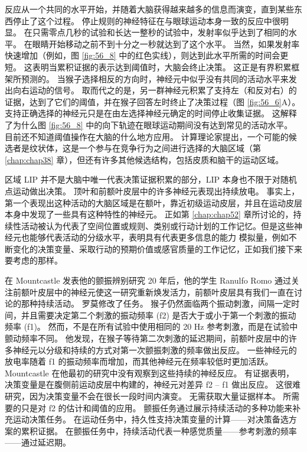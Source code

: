 反应从一个共同的水平开始，并随着大脑获得越来越多的信息而演变，直到某些东西停止了这个过程。 停止规则的神经特征在与眼球运动本身一致的反应中很明显。 在只需零点几秒的试验和长达一整秒的试验中，发射率似乎达到了相同的水平。 在眼睛开始移动之前不到十分之一秒就达到了这个水平。 当然，如果发射率快速增加（例如，图 \ref{fig:56_8} 中的红色实线），则达到此水平所需的时间会更短。 这表明当累积证据的表示达到阈值时，大脑会终止决策。 这正是有界积累框架所预测的。 当猴子选择相反的方向时，神经元中似乎没有共同的活动水平来发出向右运动的信号。 取而代之的是，另一群神经元积累了支持左（和反对右）的证据，达到了它们的阈值，并在猴子回答左时终止了决策过程（图 \ref{fig:56_6}A）。 支持正确选择的神经元只是在由左选择神经元确定的时间停止收集证据。 这解释了为什么图 \ref{fig:56_8} 中的向下轨迹在眼球运动期间没有达到常见的活动水平。 目前还不知道阈值操作在大脑的什么地方应用。 计算理论家提出，一个可能的候选者是纹状体，这是一个参与在竞争行为之间进行选择的大脑区域（第 \ref{chap:chap38} 章），但还有许多其他候选结构，包括皮质和脑干的运动区域。

区域 LIP 并不是大脑中唯一代表决策证据积累的部分，LIP 本身也不限于对随机点运动做出决策。 顶叶和前额叶皮层中的许多神经元表现出持续放电。 事实上，第一个表现出这种活动的大脑区域是在额叶，靠近初级运动皮层，并且在运动皮层本身中发现了一些具有这种特性的神经元。 正如第 \ref{chap:chap52} 章所讨论的，持续性活动被认为代表了空间位置或规则、类别或行动计划的工作记忆。但是这些神经元也能够代表活动的分级水平，表明具有代表更多信息的能力 模拟量，例如不断变化的决策变量、采取行动的预期价值或感官质量的工作记忆，正如我们接下来要考虑的那样。

在 Mountcastle 发表他的颤振辨别研究 20 年后，他的学生 Ranulfo Romo 通过关注前额叶皮层中的神经元使这一研究重新焕发活力，前额叶皮层具有我们一直在讨论的那种持续活动。 罗莫修改了任务。 猴子仍然面临两个振动刺激，间隔一定时间，并且需要决定第二个刺激的振动频率 (f2) 是否大于或小于第一个刺激的振动频率 (f1)。 然而，不是在所有试验中使用相同的 20 Hz 参考刺激，而是在试验中颤动频率不同。 他发现，在猴子等待第二次刺激的延迟期间，前额叶皮层中的许多神经元以分级和持续的方式对第一次颤振刺激的频率做出反应。 一些神经元的放电率随着 f1 的振动频率而增加，而其他神经元在频率较低时更加活跃。 Mountcastle 在他最初的研究中没有观察到这些持续的神经反应。 有证据表明，决策变量是在腹侧前运动皮层中构建的，神经元对差异 f2 – f1 做出反应。 这很难研究，因为决策变量不会在很长一段时间内演变。 无需获取大量证据样本。 所需要的只是对 f2 的估计和阈值的应用。 颤振任务通过展示持续活动的多种功能来补充运动决策任务。 在运动任务中，持久性支持决策变量的计算——对决策备选方案的累积证据。 在颤振任务中，持续活动代表一种感觉质量——参考刺激的频率——通过延迟期。


